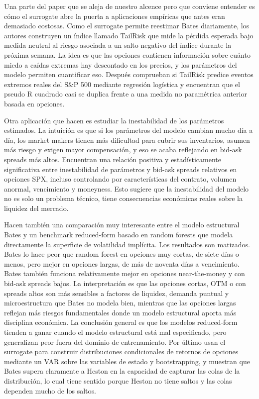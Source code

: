 \documentclass[11pt,a4paper]{article}
\begin{document}
Una parte del paper que se aleja de nuestro alcence pero que conviene entender es cómo el surrogate abre la puerta a aplicaciones empíricas que antes eran demasiado costosas. Como el surrogate permite reestimar Bates diariamente, los autores construyen un índice llamado TailRisk que mide la pérdida esperada bajo medida neutral al riesgo asociada a un salto negativo del índice durante la próxima semana. La idea es que las opciones contienen información sobre cuánto miedo a caídas extremas hay descontado en los precios, y los parámetros del modelo permiten cuantificar eso. Después comprueban si TailRisk predice eventos extremos reales del S\&P 500 mediante regresión logística y encuentran que el pseudo R cuadrado casi se duplica frente a una medida no paramétrica anterior basada en opciones.

Otra aplicación que hacen es estudiar la inestabilidad de los parámetros estimados. La intuición es que si los parámetros del modelo cambian mucho día a día, los market makers tienen más dificultad para cubrir sus inventarios, asumen más riesgo y exigen mayor compensación, y eso se acaba reflejando en bid-ask spreads más altos. Encuentran una relación positiva y estadísticamente significativa entre inestabilidad de parámetros y bid-ask spreads relativos en opciones SPX, incluso controlando por características del contrato, volumen anormal, vencimiento y moneyness. Esto sugiere que la inestabilidad del modelo no es solo un problema técnico, tiene consecuencias económicas reales sobre la liquidez del mercado.

Hacen también una comparación muy interesante entre el modelo estructural Bates y un benchmark reduced-form basado en random forests que modela directamente la superficie de volatilidad implícita. Los resultados son matizados. Bates lo hace peor que random forest en opciones muy cortas, de siete días o menos, pero mejor en opciones largas, de más de noventa días a vencimiento. Bates también funciona relativamente mejor en opciones near-the-money y con bid-ask spreads bajos. La interpretación es que las opciones cortas, OTM o con spreads altos son más sensibles a factores de liquidez, demanda puntual y microestructura que Bates no modela bien, mientras que las opciones largas reflejan más riesgos fundamentales donde un modelo estructural aporta más disciplina económica. La conclusión general es que los modelos reduced-form tienden a ganar cuando el modelo estructural está mal especificado, pero generalizan peor fuera del dominio de entrenamiento. Por último usan el surrogate para construir distribuciones condicionales de retornos de opciones mediante un VAR sobre las variables de estado y bootstrapping, y muestran que Bates supera claramente a Heston en la capacidad de capturar las colas de la distribución, lo cual tiene sentido porque Heston no tiene saltos y las colas dependen mucho de los saltos.
\end{document}
